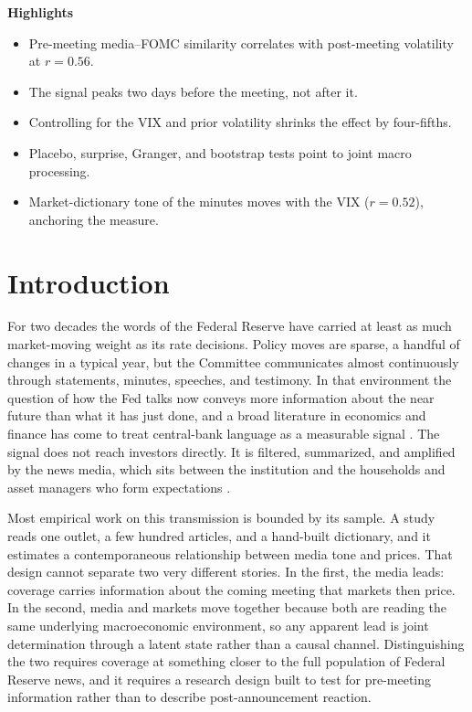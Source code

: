 \documentclass[11pt,a4paper]{article}
\begin{document}
\noindent\textbf{Highlights}
\begin{itemize}[leftmargin=1.3em,itemsep=1pt,topsep=2pt]
  \item Pre-meeting media--FOMC similarity correlates with post-meeting volatility at $r=0.56$.
  \item The signal peaks two days before the meeting, not after it.
  \item Controlling for the VIX and prior volatility shrinks the effect by four-fifths.
  \item Placebo, surprise, Granger, and bootstrap tests point to joint macro processing.
  \item Market-dictionary tone of the minutes moves with the VIX ($r=0.52$), anchoring the measure.
\end{itemize}

\section{Introduction}
\label{sec:intro}

For two decades the words of the Federal Reserve have carried at least as much
market-moving weight as its rate decisions. Policy moves are sparse, a handful of
changes in a typical year, but the Committee communicates almost continuously
through statements, minutes, speeches, and testimony. In that environment the
question of how the Fed talks now conveys more information about the near future
than what it has just done, and a broad literature in economics and finance has
come to treat central-bank language as a measurable signal
\citep{blinder2008central,hansen2016shocking}. The signal does not reach investors
directly. It is filtered, summarized, and amplified by the news media, which sits
between the institution and the households and asset managers who form
expectations \citep{tetlock2007giving}.

Most empirical work on this transmission is bounded by its sample. A study reads
one outlet, a few hundred articles, and a hand-built dictionary, and it estimates
a contemporaneous relationship between media tone and prices. That design cannot
separate two very different stories. In the first, the media leads: coverage
carries information about the coming meeting that markets then price. In the
second, media and markets move together because both are reading the same
underlying macroeconomic environment, so any apparent lead is joint determination
through a latent state rather than a causal channel. Distinguishing the two
requires coverage at something closer to the full population of Federal Reserve
news, and it requires a research design built to test for pre-meeting information
rather than to describe post-announcement reaction.
\end{document}
